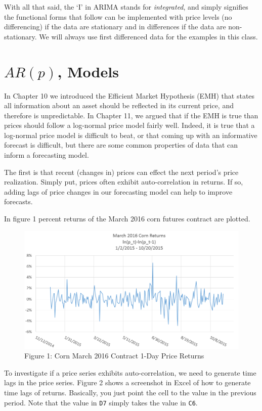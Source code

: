 \documentclass[]{book}
\theoremstyle{definition}
\theoremstyle{definition}
\theoremstyle{remark}
\begin{document}
With all that said, the `I' in ARIMA stands for \emph{integrated}, and
simply signifies the functional forms that follow can be implemented
with price levels (no differencing) if the data are stationary and in
differences if the data are non-stationary. We will always use first
differenced data for the examples in this class.

\section{\texorpdfstring{\(AR(p)\),
Models}{AR(p), Models}}\label{arp-models}

In Chapter 10 we introduced the Efficient Market Hypothesis (EMH) that
states all information about an asset should be reflected in its current
price, and therefore is unpredictable. In Chapter 11, we argued that if
the EMH is true than prices should follow a log-normal price model
fairly well. Indeed, it is true that a log-normal price model is
difficult to beat, or that coming up with an informative forecast is
difficult, but there are some common properties of data that can inform
a forecasting model.

The first is that recent (changes in) prices can effect the next
period's price realization. Simply put, prices often exhibit
auto-correlation in returns. If so, adding lags of price changes in our
forecasting model can help to improve forecasts.

In figure 1 percent returns of the March 2016 corn futures contract are
plotted.

\begin{figure}[htbp]
\centering
\includegraphics{images/12_corn_h2016.png}
\caption{Figure 1: Corn March 2016 Contract 1-Day Price Returns}
\end{figure}

To investigate if a price series exhibits auto-correlation, we need to
generate time lags in the price series. Figure 2 shows a screenshot in
Excel of how to generate time lags of returns. Basically, you just point
the cell to the value in the previous period. Note that the value in
\texttt{D7} simply takes the value in \texttt{C6}.
\end{document}
